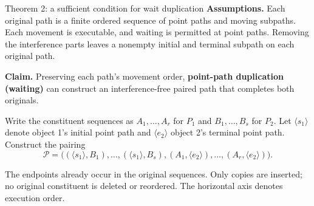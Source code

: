 \begin{frame}{Theorem 2: a sufficient condition for wait duplication}
\small
\textbf{Assumptions.} Each original path is a finite ordered sequence of point paths and moving subpaths.
Each movement is executable, and waiting is permitted at point paths.
Removing the interference parts leaves a nonempty initial and terminal subpath on each original path.
\par\medskip
\textbf{Claim.} Preserving each path's movement order, \textbf{point-path duplication (waiting)} can
construct an interference-free paired path that completes both originals.
\par\medskip
Write the constituent sequences as $A_1,\ldots,A_r$ for $P_1$ and $B_1,\ldots,B_s$ for $P_2$.
Let $\langle s_1\rangle$ denote object 1's initial point path and
$\langle e_2\rangle$ object 2's terminal point path. Construct the pairing
\begin{equation}
 \mathcal P=\bigl(
 (\langle s_1\rangle,B_1),\ldots,(\langle s_1\rangle,B_s),
 (A_1,\langle e_2\rangle),\ldots,(A_r,\langle e_2\rangle)
 \bigr).
 \tag{29}
\end{equation}
\begin{center}\end{center}
\footnotesize The endpoints already occur in the original sequences. Only copies are inserted;
no original constituent is deleted or reordered. The horizontal axis denotes execution order.
\end{frame}

